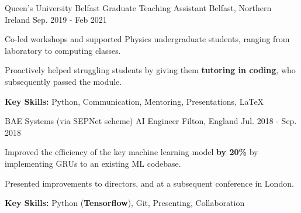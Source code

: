 \begin{cventries}
    
  \cventry
  	{Queen's University Belfast} %
    {Graduate Teaching Assistant} %
    {Belfast, Northern Ireland} %
    {Sep. 2019 - Feb 2021} %
    {
      \begin{cvitems} %
        \item {Co-led workshops and supported Physics undergraduate students, ranging from laboratory to computing classes.}
        \item {Proactively helped struggling students by giving them \textbf{tutoring in coding}, who subsequently passed the module.}
        \item {\textbf{Key Skills:} Python, Communication, Mentoring, Presentations, \LaTeX} 
      \end{cvitems}
    }

  \cventry
  	{BAE Systems (via SEPNet scheme)} %
    {AI Engineer} %
    {Filton, England} %
    {Jul. 2018 - Sep. 2018} %
    {
      \begin{cvitems} %
        \item {Improved the efficiency of the key machine learning model \textbf{by 20\%} by implementing GRUs to an existing ML codebase.}
        \item {Presented improvements to directors, and at a subsequent conference in London.}
        \item {\textbf{Key Skills:} Python (\textbf{Tensorflow}), Git, Presenting, Collaboration}
      \end{cvitems}
    }


\end{cventries}


